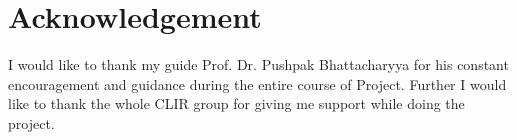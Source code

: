 \documentclass[11pt,a4paper]{report}
\def\baselinestretch{1.5}
\begin{document}
\def\title{SubModular Functions \& Text Summarizations}
\def\what{CS 691 \\ R\&D Project Report}
\def\who{Jayaprakash S}
\def\roll{123050045}
\def\guide{Prof. Dr. Pushpak Battacharya}
\titlpage
\newpage
\newpage

\section*{Acknowledgement}

I would like to thank my guide Prof. Dr. Pushpak Bhattacharyya for his constant encouragement and guidance during the entire course of Project. Further I would like to thank the whole CLIR group for giving me support while doing the project.



\newpage


\newpage

\newpage

\def\bsq{\begin{flushright} $\blacksquare$\\ \end{flushright}}
\def\tab{\hspace{5mm}}

\begingroup{}\def\baselinestretch{1.5}\tableofcontents\endgroup     

\newpage
{}




\renewcommand\bibname{References}


\nocite{*}
\end{document}
